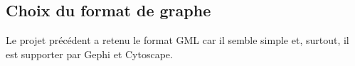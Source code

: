 \documentclass{article}
\begin{document}
\subsection{Choix du format de graphe}
Le projet précédent a retenu le format GML car il semble simple et, surtout, il
est supporter par Gephi et Cytoscape.


\newpage
\begingroup
  \renewcommand{\section}[2]{\Large\textbf{Références}\normalsize}
  
  
  \nocite{*}
\endgroup
\end{document}

